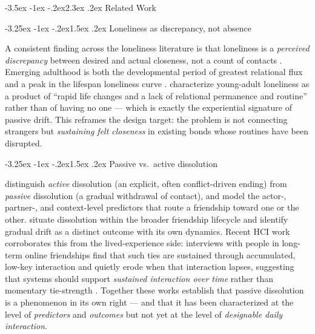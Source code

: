 \documentclass[11pt]{article}
\makeatletter
\renewcommand\section{\@startsection{section}{1}{\z@}%
  {-3.5ex \@plus -1ex \@minus -.2ex}{2.3ex \@plus .2ex}%
  {\normalfont\Large\bfseries\color{accent}}}
\renewcommand\subsection{\@startsection{subsection}{2}{\z@}%
  {-3.25ex \@plus -1ex \@minus -.2ex}{1.5ex \@plus .2ex}%
  {\normalfont\large\bfseries\color{accent}}}
\makeatother
\begin{document}
\section{Related Work}

\subsection{Loneliness as discrepancy, not absence}

A consistent finding across the loneliness literature is that loneliness is a
\emph{perceived discrepancy} between desired and actual closeness, not a count
of contacts \citep{grigoriadis2024, qualter2015}. Emerging adulthood is both the
developmental period of greatest relational flux \citep{arnett2000} and a peak in
the lifespan loneliness curve \citep{barreto2021, qualter2015}. \citet{hall2025}
characterize young-adult loneliness as a product of ``rapid life changes and a
lack of relational permanence and routine'' rather than of having no one ---
which is exactly the experiential signature of passive drift. This reframes the
design target: the problem is not connecting strangers but \emph{sustaining felt
closeness} in existing bonds whose routines have been disrupted.

\subsection{Passive vs.\ active dissolution}

\citet{vieth2022} distinguish \emph{active} dissolution (an explicit, often
conflict-driven ending) from \emph{passive} dissolution (a gradual withdrawal of
contact), and model the actor-, partner-, and context-level predictors that
route a friendship toward one or the other. \citet{santucci2025} situate
dissolution within the broader friendship lifecycle and identify gradual drift
as a distinct outcome with its own dynamics. Recent HCI work corroborates this
from the lived-experience side: interviews with people in long-term online
friendships find that such ties are sustained through accumulated, low-key
interaction and quietly erode when that interaction lapses, suggesting that
systems should support \emph{sustained interaction over time} rather than
momentary tie-strength \citep{yong2025}. Together these works establish that
passive dissolution is a phenomenon in its own right --- and that it has been
characterized at the level of \emph{predictors} and \emph{outcomes} but not yet
at the level of \emph{designable daily interaction}.
\end{document}
